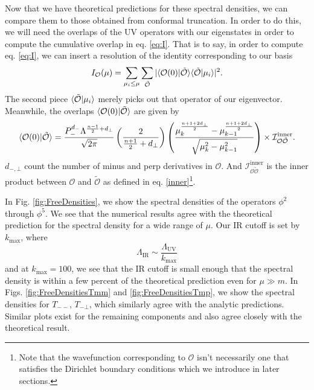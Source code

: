 Now that we have theoretical predictions for these spectral densities, we can 
compare them to those obtained from conformal truncation. In order to do this, 
we will need the overlaps of the UV operators with our eigenstates in order to 
compute the cumulative overlap in eq. \eqref{eq:I}. That is to say, in order to 
compute eq. \eqref{eq:I}, we can insert a resolution of the identity 
corresponding to our basis 
\begin{equation}
    \begin{aligned}
        I_{\mathcal{O}}(\mu) =  \sum_{\mu_i \le \mu } \sum_{\tilde{\mathcal{O}}} | \langle \mathcal{O}(0)|\tilde{\mathcal{O}}\rangle\langle \tilde{\mathcal{O}}|\mu_i\rangle|^2.
    \end{aligned}
\end{equation} 
The second piece $\langle \tilde{\mathcal{O}}|\mu_i\rangle$ merely picks out that 
operator of our eigenvector. Meanwhile, the overlaps 
$\langle \mathcal{O}(0)|\tilde{\mathcal{O}}\rangle$ are given by 
\begin{equation}
    \begin{aligned}
        \langle \mathcal{O}(0)|\tilde{\mathcal{O}}\rangle = \frac{P_-^{d_-} \Lambda^{\frac{n-1}{2}+d_{\bot}}}{\sqrt{2\pi}} \left( \frac{2}{\frac{n+1}{2}+d_\bot} \right) \left( \frac{\mu_k^{\frac{n+1+2d_\bot}{2}} - \mu_{k-1}^{\frac{n+1+2d_\bot}{2}}}{\sqrt{\mu_k^2 - \mu_{k-1}^2}} \right) \times \mathcal{I}_{\mathcal{O} \tilde{\mathcal{O}}}^{\textrm{inner}}.
    \end{aligned}
\end{equation} 
$d_{-,\bot}$ count the number of minus and perp derivatives in $\mathcal{O}$. 
And $\mathcal{I}_{\mathcal{O} \tilde{\mathcal{O}}}^{\textrm{inner}}$ is the 
inner product between $\mathcal{O}$ and $\tilde{\mathcal{O}}$ as defined in eq. 
\eqref{inner}\footnote{Note that the wavefunction corresponding to $\mathcal{O}$ 
isn't necessarily one that satisfies the Dirichlet boundary conditions which we 
introduce in later sections.}.

In Fig. \ref{fig:FreeDensities}, we show the spectral densities of the operators 
$\phi^2$ through $\phi^5$. We see that the numerical results agree with the 
theoretical prediction for the spectral density for a wide range of $\mu$. Our 
IR cutoff is set by $k_{\textrm{max}}$, where 
\begin{equation}
    \Lambda_{\textrm{IR}} \sim \frac{\Lambda_{\textrm{UV}}}{k_{\textrm{max}}}
\end{equation} 
and at $k_{\textrm{max}} = 100$, we see that the IR cutoff is small enough that 
the spectral density is within a few percent of the theoretical prediction even 
for $\mu \gg m$. In Figs. \ref{fig:FreeDensitiesTmm} and 
\ref{fig:FreeDensitiesTmp}, we show the spectral densities for 
$T_{--}$, $T_{-\bot}$, which similarly agree with the analytic predictions. 
Similar plots exist for the remaining components and also agree closely with the 
theoretical result.

